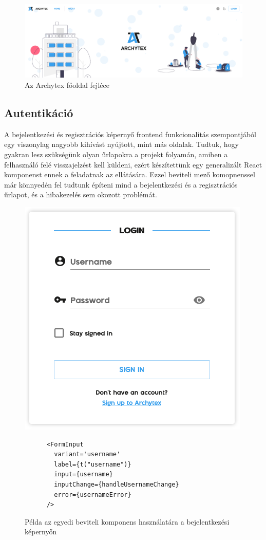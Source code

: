 \begin{figure}[h]
  \centering
  \includegraphics[width=\textwidth]{parts/developer-documentation/frontend/images/header.png}
  \caption{Az Archytex főoldal fejléce}
\end{figure}

\subsection{Autentikáció}
A bejelentkezési és regisztrációs képernyő frontend funkcionalitás szempontjából egy viszonylag nagyobb kihívást nyújtott, mint más oldalak. Tudtuk, hogy gyakran lesz szükségünk olyan űrlapokra a projekt folyamán, amiben a felhasználó felé visszajelzést kell küldeni, ezért készítettünk egy generalizált React komponenst ennek a feladatnak az ellátására. Ezzel beviteli mező komopnenssel már könnyedén fel tudtunk építeni mind a bejelentkezési és a regisztrációs űrlapot, és a hibakezelés sem okozott problémát.

\begin{figure}[h]
  \centering
  \begin{minipage}{.5\textwidth}
    \centering
    \includegraphics[width=.6\linewidth]{parts/developer-documentation/frontend/images/login.png}
    \label{fig:loginPage}
  \end{minipage}%
  \begin{minipage}{.5\textwidth}
    \centering
    \begin{lstlisting}
      <FormInput
        variant='username'
        label={t("username")}
        input={username}
        inputChange={handleUsernameChange}
        error={usernameError}
      />\end{lstlisting}
  \end{minipage}
  \caption{Példa az egyedi beviteli komponens használatára a bejelentkezési képernyőn}
\end{figure}

